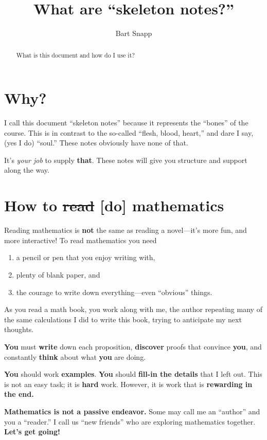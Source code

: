 

\author{Bart Snapp}

\title{What are ``skeleton notes?''}

\begin{abstract}
  What is this document and how do I use it?
\end{abstract}
\maketitle


\section{Why?}

I call this document ``skeleton notes'' because it represents the
``bones'' of the course. This is in contrast to the so-called ``flesh,
blood, heart,'' and dare I say, (yes I do) ``soul.''  These notes
obviously have none of that.


It's \textit{your job} to supply \textbf{that}. These notes will give
you structure and support along the way.






\section{How to \sout{read} [do] mathematics}

Reading mathematics is \textbf{not} the same as reading a novel---it's
more fun, and more interactive!  To read mathematics you need
\begin{enumerate}
\item a pencil or pen that you enjoy writing with,
\item plenty of blank paper, and
\item the courage to write down everything---even ``obvious'' things.
\end{enumerate}
As you read a math book, you work along with me, the author repeating
many of the same calculations I did to write this book, trying to
anticipate my next thoughts.


\textbf{You} must \textbf{write} down each proposition, \textbf{discover}
proofs that convince \textbf{you}, and constantly \textbf{think} about what \textbf{you}
are doing.

\textbf{You} should work \textbf{examples}.  \textbf{You} should
\textbf{fill-in the details} that I left out.  This is not an easy
task; it is \textbf{hard} work. However, it is work that is
\textbf{rewarding in the end.}



\textbf{Mathematics is not a passive endeavor.}  Some may call me an ``author''
and you a ``reader.'' I call us ``new friends'' who are exploring
mathematics together. \textbf{Let's get going!}




